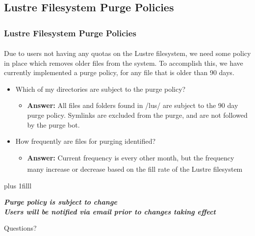 \documentclass[t,hyperref={pdfpagelabels=false}]{beamer}
\newcommand{\ctilde}{{\fontfamily{ptm}\selectfont\texttildelow}}
\newcommand{\regtrademark}{\fontsize{5}{6}\selectfont \textsuperscript{\textregistered}}
\newcommand{\btVFill}{\vskip0pt plus 1filll}
\newcommand{\lustre}{Lustre{\regtrademark}}
\begin{document}
\subsection{Lustre Filesystem Purge Policies}
\begin{frame}
\frametitle{{\lustre} Filesystem Purge Policies}
Due to users not having any quotas on the {\lustre} filesystem, we need some policy in place which removes older files from the system.  To accomplish this, we have currently implemented a purge policy, for any file that is older than 90 days.
\begin{itemize}
 \item Which of my directories are subject to the purge policy?
   \begin{itemize}
   \item \textbf{Answer:} All files and folders found in \ctilde/lus/ are subject to the 90 day purge policy.  Symlinks are excluded from the purge, and are not followed by the purge bot.  
   \end{itemize}
\item How frequently are files for purging identified?
   \begin{itemize}
   \item \textbf{Answer:} Current frequency is every other month, but the frequency many increase or decrease based on the fill rate of the {\lustre} filesystem 
	\end{itemize}
\end{itemize}
\btVFill
\begin{center}
\footnotesize \textbf{\emph{Purge policy is subject to change~\\Users will be notified via email prior to changes taking effect}}
\end{center}
\end{frame}


\begin{frame}
\Huge{\centerline{Questions?}}
\end{frame}
\end{document}
